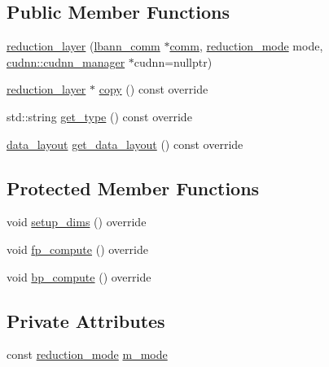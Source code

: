 \subsection*{Public Member Functions}
\begin{DoxyCompactItemize}
\item 
\hyperlink{classlbann_1_1reduction__layer_ac6e8498f03708ce51e389116107bf135}{reduction\+\_\+layer} (\hyperlink{classlbann_1_1lbann__comm}{lbann\+\_\+comm} $\ast$\hyperlink{file__io_8cpp_ab048c6f9fcbcfaa57ce68b00263dbebe}{comm}, \hyperlink{namespacelbann_a5975e1fb530a267728bfb01dc5c1be9b}{reduction\+\_\+mode} mode, \hyperlink{classlbann_1_1cudnn_1_1cudnn__manager}{cudnn\+::cudnn\+\_\+manager} $\ast$cudnn=nullptr)
\item 
\hyperlink{classlbann_1_1reduction__layer}{reduction\+\_\+layer} $\ast$ \hyperlink{classlbann_1_1reduction__layer_a5a47c9c732716928131445230ef97af6}{copy} () const override
\item 
std\+::string \hyperlink{classlbann_1_1reduction__layer_a442261c36971a6f7188d58eba50ef798}{get\+\_\+type} () const override
\item 
\hyperlink{base_8hpp_a786677cbfb3f5677b4d84f3056eb08db}{data\+\_\+layout} \hyperlink{classlbann_1_1reduction__layer_a9799e2a98d503a64b462674d0cd69b6e}{get\+\_\+data\+\_\+layout} () const override
\end{DoxyCompactItemize}
\subsection*{Protected Member Functions}
\begin{DoxyCompactItemize}
\item 
void \hyperlink{classlbann_1_1reduction__layer_aff2c5f6112da848908baba3645408e6e}{setup\+\_\+dims} () override
\item 
void \hyperlink{classlbann_1_1reduction__layer_a7e78d0d69106611bfb5ff3fe5bb01016}{fp\+\_\+compute} () override
\item 
void \hyperlink{classlbann_1_1reduction__layer_a2ea767accbf2c9fdc9074d1e473db259}{bp\+\_\+compute} () override
\end{DoxyCompactItemize}
\subsection*{Private Attributes}
\begin{DoxyCompactItemize}
\item 
const \hyperlink{namespacelbann_a5975e1fb530a267728bfb01dc5c1be9b}{reduction\+\_\+mode} \hyperlink{classlbann_1_1reduction__layer_aa8c753154fec05a00ede9217df3ba638}{m\+\_\+mode}
\end{DoxyCompactItemize}
